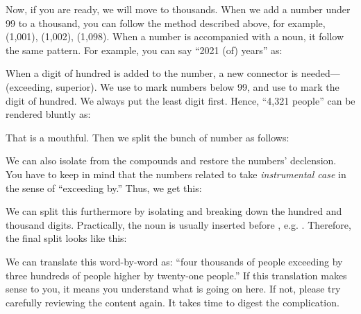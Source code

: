 Now, if you are ready, we will move to thousands. When we add a number under 99 to a thousand, you can follow the method described above, for example,  (1,001),  (1,002),  (1,098). When a number is accompanied with a noun, it follow the same pattern. For example, you can say ``2021 (of) years'' as:


When a digit of hundred is added to the number, a new connector is needed--- (exceeding, superior). We use  to mark numbers below 99, and use  to mark the digit of hundred. We always put the least digit first. Hence, ``4,321 people'' can be rendered bluntly as:


That is a mouthful. Then we split the bunch of number as follows:


We can also isolate  from the compounds and restore the numbers' declension. You have to keep in mind that the numbers related to  take \emph{instrumental case} in the sense of ``exceeding by.'' Thus, we get this:


We can split this furthermore by isolating  and breaking down the hundred and thousand digits. Practically, the noun is usually inserted before , e.g. . Therefore, the final split looks like this:


We can translate this word-by-word as: ``four thousands of people exceeding by three hundreds of people higher by twenty-one people.'' If this translation makes sense to you, it means you understand what is going on here. If not, please try carefully reviewing the content again. It takes time to digest the complication.

